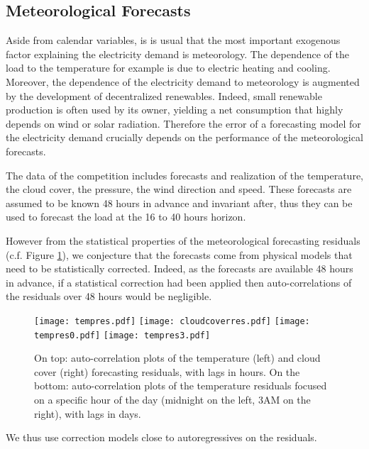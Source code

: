 \documentclass[transmag]{IEEEtran}
\begin{document}
\subsection{Meteorological Forecasts}
Aside from calendar variables, is is usual that the most important exogenous factor explaining the electricity demand is meteorology. The dependence of the load to the temperature for example is due to electric heating and cooling. Moreover, the dependence of the electricity demand to meteorology is augmented by the development of decentralized renewables. Indeed, small renewable production is often used by its owner, yielding a net consumption that highly depends on wind or solar radiation.
Therefore the error of a forecasting model for the electricity demand crucially depends on the performance of the meteorological forecasts.

The data of the competition includes forecasts and realization of the temperature, the cloud cover, the pressure, the wind direction and speed. These forecasts are assumed to be known 48 hours in advance and invariant after, thus they can be used to forecast the load at the 16 to 40 hours horizon.

However from the statistical properties of the meteorological forecasting residuals (c.f. Figure \ref{fig:meteoresiduals}), we conjecture that the forecasts come from physical models that need to be statistically corrected. Indeed, as the forecasts are available 48 hours in advance, if a statistical correction had been applied then auto-correlations of the residuals over 48 hours would be negligible.
\begin{figure}
    \centering
    \texttt{[image: tempres.pdf]}
    \texttt{[image: cloudcoverres.pdf]}
    \texttt{[image: tempres0.pdf]}
    \texttt{[image: tempres3.pdf]}
    \caption{On top: auto-correlation plots of the temperature (left) and cloud cover (right) forecasting residuals, with lags in hours. On the bottom: auto-correlation plots of the temperature residuals focused on a specific hour of the day (midnight on the left, 3AM on the right), with lags in days.}
    \label{fig:meteoresiduals}
\end{figure}
We thus use correction models close to autoregressives on the residuals.
\end{document}
